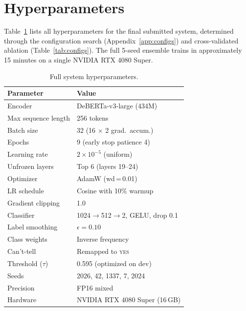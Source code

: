 \documentclass[11pt]{article}
\begin{document}

% 

\appendix

\section{Hyperparameters}
\label{app:hyperparams}

Table~\ref{tab:hyperparams} lists all hyperparameters for the final submitted system, determined through the configuration search (Appendix~\ref{app:configs}) and cross-validated ablation (Table~\ref{tab:configs}).
The full 5-seed ensemble trains in approximately 15 minutes on a single NVIDIA RTX 4080 Super.

\begin{table}[h]
\centering\small
\begin{tabular}{@{}ll@{}}
\toprule
\textbf{Parameter} & \textbf{Value} \\
\midrule
Encoder             & DeBERTa-v3-large (434M) \\
Max sequence length & 256 tokens \\
Batch size          & 32 (16 $\times$ 2 grad.\ accum.) \\
Epochs              & 9 (early stop patience 4) \\
Learning rate       & $2{\times}10^{-5}$ (uniform) \\
Unfrozen layers     & Top 6 (layers 19--24) \\
Optimizer           & AdamW (wd\,=\,0.01) \\
LR schedule         & Cosine with 10\% warmup \\
Gradient clipping   & 1.0 \\
Classifier          & 1024$\to$512$\to$2, GELU, drop 0.1 \\
Label smoothing     & $\epsilon = 0.10$ \\
Class weights       & Inverse frequency \\
Can't-tell          & Remapped to \textsc{yes} \\
Threshold ($\tau$)  & 0.595 (optimized on dev) \\
Seeds               & 2026, 42, 1337, 7, 2024 \\
Precision           & FP16 mixed \\
Hardware            & NVIDIA RTX 4080 Super (16\,GB) \\
\bottomrule
\end{tabular}
\caption{Full system hyperparameters.}
\label{tab:hyperparams}
\end{table}
\end{document}
